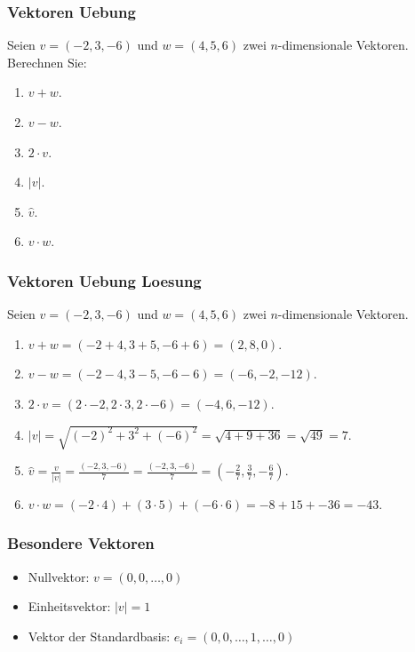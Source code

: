 \begin{frame}
    \frametitle{Vektoren Uebung}
    Seien $v = (-2, 3, -6)$ und $w = (4, 5, 6)$ zwei $n$-dimensionale Vektoren.
    Berechnen Sie:
    \begin{enumerate}
        \item $v + w$.
        \item $v - w$.
        \item $2 \cdot v$.
        \item $|v|$.
        \item $\hat{v}$.
        \item $v \cdot w$.
    \end{enumerate}
\end{frame}

\begin{frame}
    \frametitle{Vektoren Uebung Loesung}
    Seien $v = (-2, 3, -6)$ und $w = (4, 5, 6)$ zwei $n$-dimensionale Vektoren.
    \begin{enumerate}
        \item $v + w = (-2 + 4, 3 + 5, -6 + 6) = (2, 8, 0)$.
        \item $v - w = (-2 - 4, 3 - 5, -6 - 6) = (-6, -2, -12)$.
        \item $2 \cdot v = (2 \cdot -2, 2 \cdot 3, 2 \cdot -6) = (-4, 6, -12)$.
        \item $|v| = \sqrt{(-2)^2 + 3^2 + (-6)^2} = \sqrt{4 + 9 + 36} = \sqrt{49} = 7$.
        \item $\hat{v} = \frac{v}{|v|} = \frac{(-2, 3, -6)}{7} = \frac{(-2, 3, -6)}{7} = (-\frac{2}{7}, \frac{3}{7}, -\frac{6}{7})$.
        \item $v \cdot w = (-2 \cdot 4) + (3 \cdot 5) + (-6 \cdot 6) = -8 + 15 + -36 = -43$.
    \end{enumerate}
\end{frame}

\begin{frame}
    \frametitle{Besondere Vektoren}
    \begin{itemize}
        \item Nullvektor: $v = (0, 0, \dots, 0)$
        \item Einheitsvektor: $|v| = 1$
        \item Vektor der Standardbasis: $e_i = (0, 0, \dots, 1, \dots, 0)$
    \end{itemize}
\end{frame}

